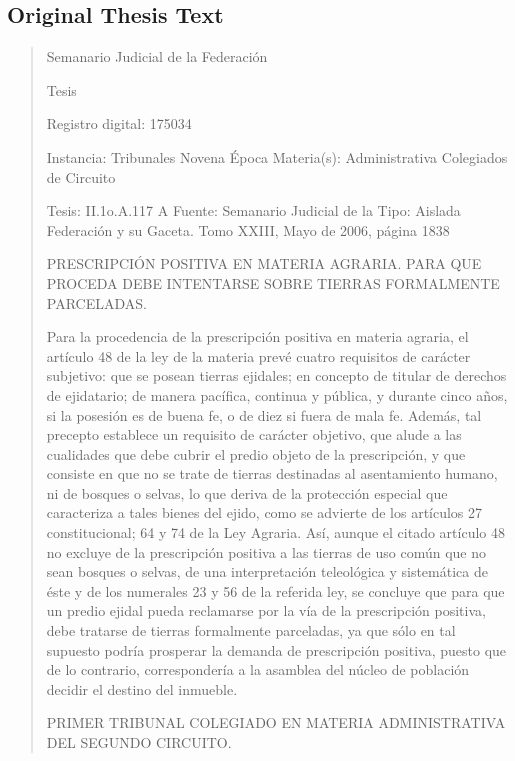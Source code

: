 \documentclass[11pt,a4paper]{article}
\begin{document}
\subsection{Original Thesis Text}

\begin{quote}
                                                   Semanario Judicial de la Federación

                                                  Tesis

 Registro digital: 175034

 Instancia: Tribunales            Novena Época                          Materia(s): Administrativa
 Colegiados de Circuito

 Tesis: II.1o.A.117 A             Fuente: Semanario Judicial de la      Tipo: Aislada
                                  Federación y su Gaceta.
                                  Tomo XXIII, Mayo de 2006, página
                                  1838


PRESCRIPCIÓN POSITIVA EN MATERIA AGRARIA. PARA QUE PROCEDA DEBE INTENTARSE
SOBRE TIERRAS FORMALMENTE PARCELADAS.


Para la procedencia de la prescripción positiva en materia agraria, el artículo 48 de la ley de la
materia prevé cuatro requisitos de carácter subjetivo: que se posean tierras ejidales; en concepto de
titular de derechos de ejidatario; de manera pacífica, continua y pública, y durante cinco años, si la
posesión es de buena fe, o de diez si fuera de mala fe. Además, tal precepto establece un requisito
de carácter objetivo, que alude a las cualidades que debe cubrir el predio objeto de la prescripción,
y que consiste en que no se trate de tierras destinadas al asentamiento humano, ni de bosques o
selvas, lo que deriva de la protección especial que caracteriza a tales bienes del ejido, como se
advierte de los artículos 27 constitucional; 64 y 74 de la Ley Agraria. Así, aunque el citado artículo
48 no excluye de la prescripción positiva a las tierras de uso común que no sean bosques o selvas,
de una interpretación teleológica y sistemática de éste y de los numerales 23 y 56 de la referida ley,
se concluye que para que un predio ejidal pueda reclamarse por la vía de la prescripción positiva,
debe tratarse de tierras formalmente parceladas, ya que sólo en tal supuesto podría prosperar la
demanda de prescripción positiva, puesto que de lo contrario, correspondería a la asamblea del
núcleo de población decidir el destino del inmueble.

PRIMER TRIBUNAL COLEGIADO EN MATERIA ADMINISTRATIVA DEL SEGUNDO CIRCUITO.



\end{quote}
\end{document}

